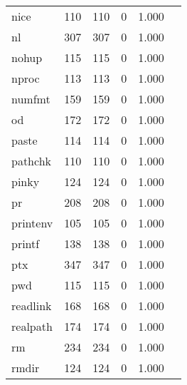\begin{longtable}{lp{2.40cm}p{2.40cm}p{2.40cm}p{2.40cm}p{2.40cm}}
nice      &                     110 &              110 &                 0 &                        1.000 \\
nl        &                     307 &              307 &                 0 &                        1.000 \\
nohup     &                     115 &              115 &                 0 &                        1.000 \\
nproc     &                     113 &              113 &                 0 &                        1.000 \\
numfmt    &                     159 &              159 &                 0 &                        1.000 \\
od        &                     172 &              172 &                 0 &                        1.000 \\
paste     &                     114 &              114 &                 0 &                        1.000 \\
pathchk   &                     110 &              110 &                 0 &                        1.000 \\
pinky     &                     124 &              124 &                 0 &                        1.000 \\
pr        &                     208 &              208 &                 0 &                        1.000 \\
printenv  &                     105 &              105 &                 0 &                        1.000 \\
printf    &                     138 &              138 &                 0 &                        1.000 \\
ptx       &                     347 &              347 &                 0 &                        1.000 \\
pwd       &                     115 &              115 &                 0 &                        1.000 \\
readlink  &                     168 &              168 &                 0 &                        1.000 \\
realpath  &                     174 &              174 &                 0 &                        1.000 \\
rm        &                     234 &              234 &                 0 &                        1.000 \\
rmdir     &                     124 &              124 &                 0 &                        1.000 \\

\end{longtable}
